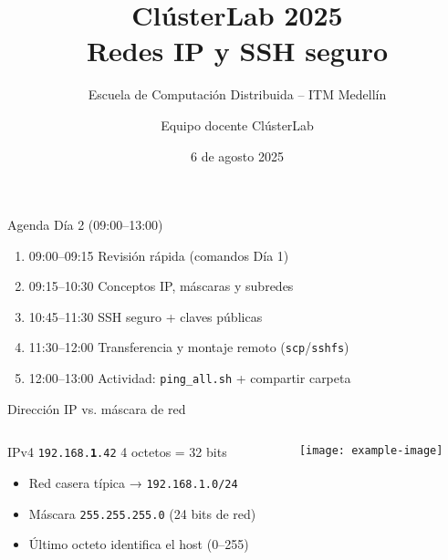 \documentclass[aspectratio=169, professionalfonts]{beamer}
\title[ClústerLab • Día 2]{ClústerLab 2025\\\huge Redes IP y SSH seguro}
\subtitle{Escuela de Computación Distribuida – ITM Medellín}
\author{Equipo docente ClústerLab}
\date{6 de agosto 2025}
\begin{document}
\begin{frame}[plain]
  \titlepage
\end{frame}

\begin{frame}{Agenda Día 2 (09:00–13:00)}
\begin{enumerate}
  \item 09:00–09:15  Revisión rápida (comandos Día 1)
  \item 09:15–10:30  Conceptos IP, máscaras y subredes
  \item 10:45–11:30  SSH seguro + claves públicas
  \item 11:30–12:00  Transferencia y montaje remoto (\texttt{scp}/\texttt{sshfs})
  \item 12:00–13:00  Actividad: \texttt{ping\_all.sh} + compartir carpeta
\end{enumerate}
\end{frame}

\begin{frame}{Dirección IP vs. máscara de red}
\begin{columns}[T]
\begin{column}{0.55\textwidth}
\begin{block}{IPv4}
  \texttt{192.168.\textbf{1}.42}\newline
  \small 4 octetos = 32 bits
\end{block}
\pause
\begin{itemize}
  \item Red casera típica → \texttt{192.168.1.0/24}
  \item Máscara \texttt{255.255.255.0} (24 bits de red)
  \item Último octeto identifica el host (0–255)
\end{itemize}
\end{column}
\begin{column}{0.4\textwidth}
  \centering\texttt{[image: example-image]}
\end{column}
\end{columns}
\end{frame}
\end{document}
